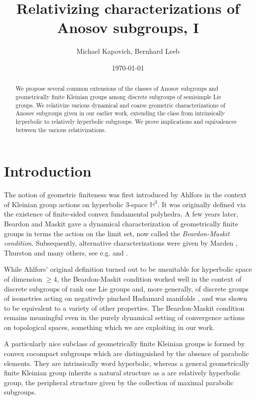 \documentclass[12pt]{article}
\theoremstyle{boldplain}
\theoremstyle{bolddefinition}
\numberwithin{equation}{section}
\def\H{{\mathbb H}}
\begin{document}
\title{Relativizing characterizations of Anosov subgroups, I} 
\author{Michael Kapovich, Bernhard Leeb}
\date{\today}
\maketitle

\begin{abstract}
We propose several common extensions of the classes of Anosov subgroups and geometrically finite Kleinian groups
among discrete subgroups of semisimple Lie groups. 
We relativize various dynamical and coarse geometric characterizations of Anosov subgroups
given in our earlier work,
extending the class from intrinsically hyperbolic to relatively hyperbolic subgroups. 
We prove implications and equivalences between the various relativizations.
\end{abstract}

\tableofcontents

\section{Introduction}

The notion of geometric finiteness was first introduced by Ahlfors \cite{Ahlfors} 
in the context of Kleinian group actions on hyperbolic 3-space $\H^3$.
It was originally defined via the existence of finite-sided convex fundamental polyhedra. 
A few years later, Beardon and Maskit \cite{BM} 
gave a dynamical characterization of geometrically finite groups in terms the action on the limit set,
now called the {\em Beardon-Maskit condition}. 
Subsequently, alternative characterizations were given by Marden \cite{Marden}, Thurston \cite{Thurston} and many others,
see e.g.  \cite{Bowditch93} and \cite{Rat}.

While Ahlfors' original definition turned out to be unsuitable for hyperbolic space of dimension $\ge 4$, 
the Beardon-Maskit condition worked well in the context of discrete subgroups of rank one Lie groups and, 
more generally, of discrete groups of isometries acting on negatively pinched Hadamard manifolds \cite{Bowditch},
and was shown to be equivalent to a variety of other properties.
The Beardon-Maskit condition remains meaningful even in the purely dynamical setting of 
convergence actions on topological spaces,
something which we are exploiting in our work.

A particularly nice subclass of geometrically finite Kleinian groups is formed by convex cocompact subgroups
which are distinguished by the absence of parabolic elements. 
They are intrinsically word hyperbolic,
whereas a general geometrically finite Kleinian group inherits a natural structure as a are relatively hyperbolic group,
the peripheral structure given by the collection of maximal parabolic subgroups.
\end{document}
